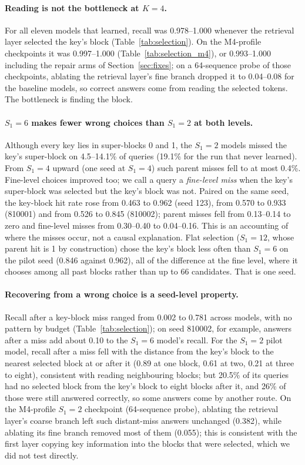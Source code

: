 \paragraph{Reading is not the bottleneck at $K{=}4$.} For all eleven models that learned, recall was 0.978--1.000
whenever the retrieval layer selected the key's block (Table~\ref{tab:selection}). On the M4-profile checkpoints it was
0.997--1.000 (Table~\ref{tab:selection_m4}), or 0.993--1.000 including the repair arms of Section~\ref{sec:fixes}; on a
64-sequence probe of those checkpoints, ablating the retrieval layer's fine branch dropped it to 0.04--0.08 for the
baseline models, so correct answers come from reading the selected tokens. The bottleneck is finding the block.

\paragraph{$S_1{=}6$ makes fewer wrong choices than $S_1{=}2$ at both levels.} Although every key lies in super-blocks
0 and 1, the $S_1{=}2$ models missed the key's super-block on 4.5--14.1\% of queries (19.1\% for the run that never
learned). From $S_1{=}4$ upward (one seed at $S_1{=}4$) such parent misses fell to at most 0.4\%. Fine-level choices
improved too; we call a query a \emph{fine-level miss} when the key's super-block was selected but the key's block
was not. Paired on the same seed, the key-block hit rate rose from 0.463 to 0.962 (seed 123), from 0.570 to 0.933
(810001) and from 0.526 to 0.845 (810002); parent misses fell from 0.13--0.14 to zero and fine-level misses from
0.30--0.40 to 0.04--0.16. This is an accounting of where the misses occur, not a causal explanation. Flat selection
($S_1{=}12$, whose parent hit is 1 by construction) chose the key's block less often than $S_1{=}6$ on the pilot seed
(0.846 against 0.962), all of the difference at the fine level, where it chooses among all past blocks rather than
up to 66 candidates. That is one seed.

\paragraph{Recovering from a wrong choice is a seed-level property.} Recall after a key-block miss ranged from 0.002 to
0.781 across models, with no pattern by budget (Table~\ref{tab:selection}); on seed 810002, for example, answers after
a miss add about 0.10 to the $S_1{=}6$ model's recall. For the $S_1{=}2$ pilot model, recall after a miss fell with the
distance from the key's block to the nearest selected block at or after it (0.89 at one block, 0.61 at two, 0.21 at
three to eight), consistent with reading neighbouring blocks; but 20.5\% of its queries had no selected block from the
key's block to eight blocks after it, and 26\% of those were still answered correctly, so some answers come by
another route. On the M4-profile $S_1{=}2$ checkpoint (64-sequence probe), ablating the retrieval layer's coarse
branch left such distant-miss answers unchanged (0.382), while ablating its fine branch removed most of them
(0.055); this is consistent with the first layer copying key information into the blocks that were selected, which
we did not test directly.

